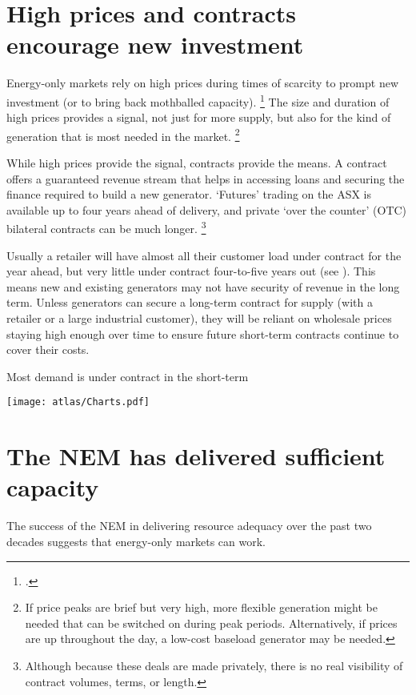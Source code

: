 \documentclass[FrontPage]{grattan}
\begin{document}
\section{High prices and contracts encourage new investment}\label{sec:scarcity-pricing-encourages-new-investment}
Energy-only markets rely on high prices during times of scarcity to prompt new investment (or to bring back mothballed capacity).%
\footcite{hogan2005energy}
The size and duration of high prices provides a signal, not just for more supply, but also for the kind of generation that is most needed in the market.%
\footnote{\eg{} If price peaks are brief but very high, more flexible generation might be needed that can be switched on during peak periods. Alternatively, if prices are up throughout the day, a low-cost baseload generator may be needed.}

While high prices provide the signal, contracts provide the means. A contract offers a guaranteed revenue stream that helps in accessing loans and securing the finance required to build a new generator. `Futures' trading on the ASX is available up to four years ahead of delivery, and private `over the counter' (OTC) bilateral contracts can be much longer.%
\footnote{Although because these deals are made privately, there is no real visibility of contract volumes, terms, or length.}

Usually a retailer will have almost all their customer load under contract for the year ahead, but very little under contract four-to-five years out (see ).
This means new and existing generators may not have security of revenue in the long term. Unless generators can secure a long-term contract for supply (with a retailer or a large industrial customer), they will be reliant on wholesale prices staying high enough over time to ensure future short-term contracts continue to cover their costs.

\begin{figureTop}
\caption{Most demand is under contract in the short-term}\label{fig:most-demand-is-under-contract}
\texttt{[image: atlas/Charts.pdf]}
\end{figureTop}

\section{The NEM has delivered sufficient capacity}\label{sec:the-NEM-has-delivered-investment-in-the-past}
The success of the NEM in delivering resource adequacy over the past two decades suggests that energy-only markets can work.
\end{document}
